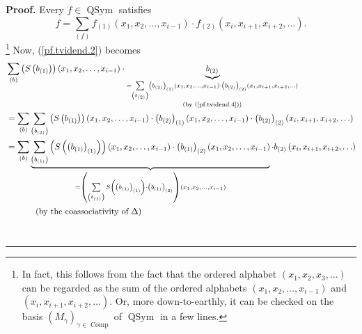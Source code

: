 \documentclass[numbers=enddot,12pt,final,onecolumn,notitlepage,abstracton]{scrartcl}%
\theoremstyle{definition}
\newenvironment{proof}[1][Proof]{\noindent\textbf{#1.} }{\ \rule{0.5em}{0.5em}}
\newenvironment{verlong}{}{}
\newenvironment{noncompile}{}{}
\let\sumnonlimits\sum
\renewcommand{\sum}{\sumnonlimits\limits}
\begin{document}
\begin{verlong}
\begin{noncompile}
\begin{proof}
Every $f\in\operatorname*{QSym}$ satisfies%
\begin{equation}
f=\sum_{\left(  f\right)  }f_{\left(  1\right)  }\left(  x_{1},x_{2}%
,\ldots,x_{i-1}\right)  \cdot f_{\left(  2\right)  }\left(  x_{i}%
,x_{i+1},x_{i+2},\ldots\right)  . \label{pf.tvidend.4}%
\end{equation}
\footnote{In fact, this follows from the fact that the ordered alphabet
$\left(  x_{1},x_{2},x_{3},\ldots\right)  $ can be regarded as the sum of the
ordered alphabets $\left(  x_{1},x_{2},\ldots,x_{i-1}\right)  $ and $\left(
x_{i},x_{i+1},x_{i+2},\ldots\right)  $. Or, more down-to-earthly, it can be
checked on the basis $\left(  M_{\gamma}\right)  _{\gamma\in
\operatorname*{Comp}}$ of $\operatorname*{QSym}$ in a few lines.} Now,
(\ref{pf.tvidend.2}) becomes%
\begin{align*}
&  \sum_{\left(  b\right)  }\left(  S\left(  b_{\left(  1\right)  }\right)
\right)  \left(  x_{1},x_{2},\ldots,x_{i-1}\right)  \cdot
\underbrace{b_{\left(  2\right)  }}_{\substack{=\sum_{\left(  b_{\left(
2\right)  }\right)  }\left(  b_{\left(  2\right)  }\right)  _{\left(
1\right)  }\left(  x_{1},x_{2},\ldots,x_{i-1}\right)  \cdot\left(  b_{\left(
2\right)  }\right)  _{\left(  2\right)  }\left(  x_{i},x_{i+1},x_{i+2}%
,\ldots\right)  \\\text{(by (\ref{pf.tvidend.4}))}}}\\
&  =\sum_{\left(  b\right)  }\sum_{\left(  b_{\left(  2\right)  }\right)
}\left(  S\left(  b_{\left(  1\right)  }\right)  \right)  \left(  x_{1}%
,x_{2},\ldots,x_{i-1}\right)  \cdot\left(  b_{\left(  2\right)  }\right)
_{\left(  1\right)  }\left(  x_{1},x_{2},\ldots,x_{i-1}\right)  \cdot\left(
b_{\left(  2\right)  }\right)  _{\left(  2\right)  }\left(  x_{i}%
,x_{i+1},x_{i+2},\ldots\right) \\
&  =\sum_{\left(  b\right)  }\underbrace{\sum_{\left(  b_{\left(  1\right)
}\right)  }\left(  S\left(  \left(  b_{\left(  1\right)  }\right)  _{\left(
1\right)  }\right)  \right)  \left(  x_{1},x_{2},\ldots,x_{i-1}\right)
\cdot\left(  b_{\left(  1\right)  }\right)  _{\left(  2\right)  }\left(
x_{1},x_{2},\ldots,x_{i-1}\right)  }_{=\left(  \sum_{\left(  b_{\left(
1\right)  }\right)  }S\left(  \left(  b_{\left(  1\right)  }\right)  _{\left(
1\right)  }\right)  \cdot\left(  b_{\left(  1\right)  }\right)  _{\left(
2\right)  }\right)  \left(  x_{1},x_{2},\ldots,x_{i-1}\right)  }\cdot
b_{\left(  2\right)  }\left(  x_{i},x_{i+1},x_{i+2},\ldots\right) \\
&  \ \ \ \ \ \ \ \ \ \ \left(  \text{by the coassociativity of }\Delta\right)

\end{align*}
\end{proof}
\end{noncompile}
\end{verlong}
\end{document}
